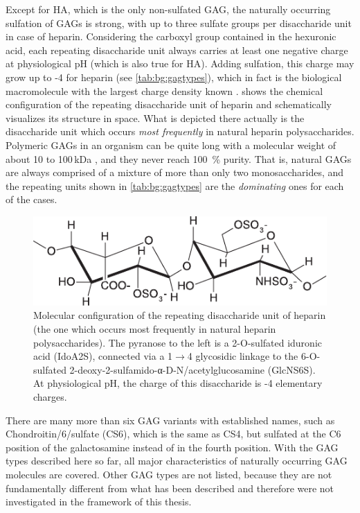 Except for HA, which is the only non-sulfated GAG, the naturally occurring
sulfation of GAGs is strong, with up to three sulfate groups per disaccharide
unit in case of heparin. Considering the carboxyl group contained in the
hexuronic acid, each repeating disaccharide unit always carries at least one
negative charge at physiological pH (which is also true for HA). Adding
sulfation, this charge may grow up to -4 for heparin (see
\cref{tab:bg:gagtypes}), which in fact is the biological macromolecule with the
largest charge density known \cite{capila_linhardt_hep_prot_2002}.
 shows the chemical configuration of the
repeating disaccharide unit of heparin and schematically visualizes its
structure in space. What is depicted there actually is the disaccharide unit
which occurs \textit{most frequently} in natural heparin polysaccharides.
Polymeric GAGs in an organism can be quite long with a molecular weight of about
10 to 100\,kDa \cite{gandhi_structure_2008}, and they never reach
\SI{100}{\percent} purity. That is, natural GAGs are always comprised of a
mixture of more than only two monosaccharides, and the repeating units shown in
\cref{tab:bg:gagtypes} are the \textit{dominating} ones for each of the cases.

\begin{figure}
\centering
\includegraphics[width=1.0\textwidth]{gfx/background/hp_repeating_unit_structure_01.pdf}
\caption[]{
Molecular configuration of the repeating disaccharide unit of heparin (the one
which occurs most frequently in natural heparin polysaccharides). The pyranose
to the left is a 2-O-sulfated iduronic acid (IdoA2S), connected via a
1$\rightarrow$4 glycosidic linkage to the 6-O-sulfated
2-deoxy-2-sulfamido-α-D-N\-/acetylglucosamine (GlcNS6S). At physiological pH,
the charge of this disaccharide is -4 elementary charges.
}
\label{fig:bg:heparin_chemstruct}
\end{figure}

There are many more than six GAG variants with established names, such as
Chondroitin\-/6\-/sulfate (CS6), which is the same as CS4, but sulfated at the
C6 position of the galactosamine instead of in the fourth position. With the GAG
types described here so far, all major characteristics of naturally occurring
GAG molecules are covered. Other GAG types are not listed, because they are not
fundamentally different from what has been described and therefore were not
investigated in the framework of this thesis.

